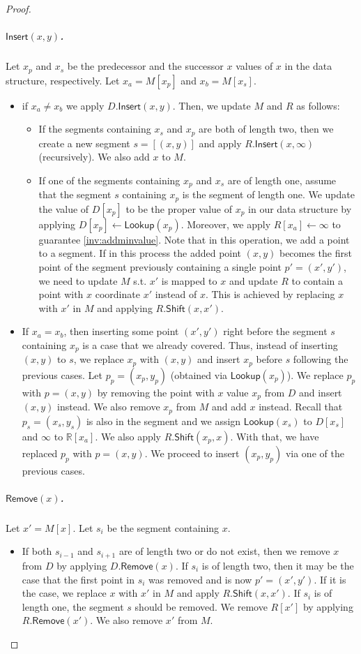 \documentclass[10pt,a4paper]{article}
\newcommand{\R}{\mathbb{R}}
\newcommand{\assign}{\leftarrow}
\newcommand{\ShiftOp}{\mathsf{Shift}}
\newcommand{\Insert}{\mathsf{Insert}}
\newcommand{\Remove}{\mathsf{Remove}}
\newcommand{\Lookup}{\mathsf{Lookup}}
\newcommand{\para}[1]{\vspace{-0.1in} \subparagraph*{#1}}
\begin{document}
\begin{proof}
\para{$\Insert(x,y)$.}
Let $x_p$ and $x_s$ be the predecessor and the successor $x$ values of $x$ in the data structure, respectively.
Let $x_a = M[x_p]$ and $x_b= M[x_s]$.
\begin{itemize}
    \item if $x_a\ne x_b$ 
    we apply $D.\Insert(x,y)$.
    Then, we update $M$ and $R$ as follows:
    \begin{itemize}
        \item If the segments containing $x_s$ and $x_p$ are both of length two, 
        then we create a new segment $s=[(x,y)]$ and apply $R.\Insert(x,\infty)$ (recursively).
        We also add $x$ to $M$.
        \item If one of the segments containing $x_p$ and $x_s$ are of length one, 
        assume that the segment $s$ containing $x_p$ is the segment of length one.
        We update the value of $D[x_{p}]$ to be the proper value of $x_p$ in our data structure by applying $D[x_{p}]\assign \Lookup(x_{p})$. 
        Moreover, we apply $R[x_a]\assign\infty$ to guarantee \cref{inv:addminvalue}.
        Note that in this operation, we add a point to a segment.
        If in this process the added point $(x,y)$ becomes the first point of the segment previously containing a single point $p'= (x',y')$, we need to update $M$ s.t. $x'$ is mapped to $x$ and update $R$ to contain a point with $x$ coordinate $x'$ instead of $x$.
        This is achieved by replacing $x$ with $x'$ in $M$ and applying $R.\ShiftOp(x,x')$.
    \end{itemize}
    \item If $x_a=x_b$, then inserting some point $(x',y')$ right before the segment $s$ containing $x_p$ is a case that we already covered.
    Thus, instead of inserting $(x,y)$ to $s$, we replace $x_p$ with $(x,y)$ and insert $x_p$ before $s$ following the previous cases.
    Let $p_p = (x_p,y_p)$ (obtained via $\Lookup(x_p)$). 
    We replace $p_p$ with $p=(x,y)$ by removing the point with $x$ value $x_p$ from $D$ and insert $(x,y)$ instead.
    We also remove $x_p$ from $M$ and add $x$ instead.
    Recall that $p_s = (x_s,y_s)$ is also in the segment 
    and we assign $\Lookup(x_{s})$ to $D[x_s]$ and $\infty$ to $\R[x_a]$.
    We also apply $R.\ShiftOp(x_p,x)$.
    With that, we have replaced $p_p$ with $p=(x,y)$.
    We proceed to insert $(x_p,y_p)$ via one of the previous cases.
\end{itemize}

\para{$\Remove(x)$.}
Let $x'=M[x]$. Let $s_{i}$ be the segment containing $x$. 
\begin{itemize}
    \item If both $s_{i-1}$ and $s_{i+1}$ are of length two or do not exist, then we remove $x$ from $D$ by applying $D.\Remove(x)$.
        If $s_{i}$ is of length two, then it may be the case that the first point in $s_{i}$ was removed and is now $p'=(x',y')$.
        If it is the case, we replace $x$ with $x'$ in $M$ and apply $R.\ShiftOp(x,x')$.
        If $s_{i}$ is of length one, the segment $s$ should be removed.
            We remove $R[x']$ by applying $R.\Remove(x')$.
            We also remove $x'$ from $M$.
    

\end{itemize}
\end{proof}
\end{document}
